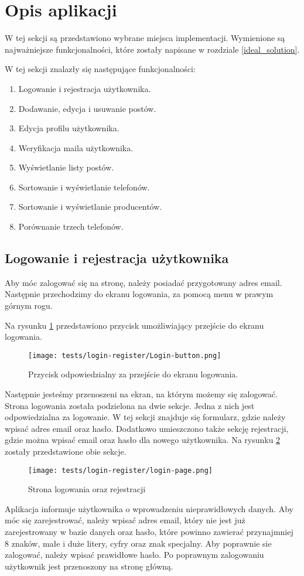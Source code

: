 \section{Opis aplikacji}
W tej sekcji są przedstawiono wybrane miejsca implementacji. Wymienione są najważniejsze funkcjonalności, które zostały napisane w rozdziale \ref{ideal_solution}.

W tej sekcji znalazły się następujące funkcjonalności:
\begin{enumerate}
  \item Logowanie i rejestracja użytkownika.
  \item Dodawanie, edycja i usuwanie postów.
  \item Edycja profilu użytkownika.
  \item Weryfikacja maila użytkownika.
  \item Wyświetlanie listy postów.
  \item Sortowanie i wyświetlanie telefonów.
  \item Sortowanie i wyświetlanie producentów.
  \item Porównanie trzech telefonów.
\end{enumerate}

\subsection{Logowanie i rejestracja użytkownika}
Aby móc zalogować się na stronę, należy posiadać przygotowany adres email. Następnie przechodzimy do ekranu logowania, za pomocą menu w prawym górnym rogu.

Na rysunku \ref{login_menu} przedstawiono przycisk umożliwiający przejście do ekranu logowania.
\begin{figure}[H]
  \centering
  \texttt{[image: tests/login-register/Login-button.png]}
  \caption{Przycisk odpowiedzialny za przejście do ekranu logowania.}
  \label{login_menu}
\end{figure}
Następnie jesteśmy przenoszeni na ekran, na którym możemy się zalogować. Strona logowania została podzielona na dwie sekcje. Jedna z nich jest odpowiedzialna za logowanie. W tej sekcji znajduje się formularz, gdzie należy wpisać adres email oraz hasło. Dodatkowo umieszczono także sekcję rejestracji, gdzie można wpisać email oraz hasło dla nowego użytkownika. Na rysunku \ref{login_page} zostały przedstawione obie sekcje.
\begin{figure}[H]
  \centering
  \texttt{[image: tests/login-register/login-page.png]}
  \caption{Strona logowania oraz rejestracji}
  \label{login_page}
\end{figure}
Aplikacja informuje użytkownika o wprowadzeniu nieprawidłowych danych. Aby móc się zarejestrować, należy wpisać adres email, który nie jest już zarejestrowany w bazie danych oraz hasło, które powinno zawierać przynajmniej 8 znaków, małe i duże litery, cyfry oraz znak specjalny. Aby poprawnie sie zalogować, należy wpisać prawidłowe hasło. Po poprawnym zalogowaniu użytkownik jest przenoszony na stronę główną. 

